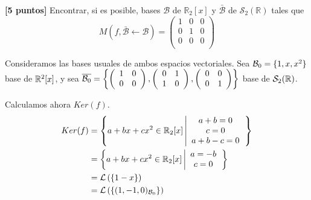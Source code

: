 \documentclass[12pt]{article}
\begin{document}
\begin{ejercicio}\textbf{[5 puntos]}
    Encontrar, si es posible, bases $\mathcal{B}$ de $\mathbb{R}_2[x]$ y $\mathcal{\bar{B}}$ de $\mathcal{S}_2(\mathbb{R})$ tales que
    \begin{equation*}
    M(f, \mathcal{\bar{B}} \longleftarrow \mathcal{B}) = \left( \begin{array}{ccc}
        1 & 0 & 0 \\
        0 & 1 & 0 \\
        0 & 0 & 0 \\
    \end{array}\right)
    \end{equation*}

    Consideramos las bases usuales de ambos espacios vectoriales. Sea $\mathcal{B}_0=\{1,x,x^2\}$ base de $\mathbb{R}^2[x]$, y sea $\overline{\mathcal{B}_0}=\left\{
    \left(\begin{array}{cc}
        1 & 0 \\
        0 & 0
    \end{array}\right),
    \left(\begin{array}{cc}
        0 & 1 \\
        1 & 0
    \end{array}\right),
    \left(\begin{array}{cc}
        0 & 0 \\
        0 & 1
    \end{array}\right)
    \right\}$ base de $\mathcal{S}_2(\mathbb{R})$.
    
    Calculamos ahora $Ker(f)$.
    \begin{equation*}\begin{split}
        Ker(f)&= \left\{a+bx+cx^2 \in \mathbb{R}_2[x] \left|\begin{array}{c}
            a+b=0\\ c=0 \\ a+b-c=0
        \end{array}\right.\right\} \\
        &= \left\{a+bx+cx^2 \in \mathbb{R}_2[x] \left|\begin{array}{c}
            a=-b\\ c=0
        \end{array}\right.\right\} \\
        &= \mathcal{L}\left(\{1-x\}\right) \\
        &= \mathcal{L}\left(\{(1,-1,0)_{\mathcal{B}_0}\}\right)
    \end{split}\end{equation*}


\end{ejercicio}
\end{document}
